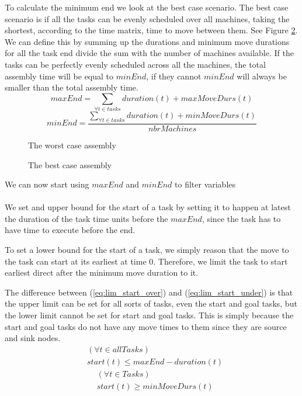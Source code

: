    To calculate the minimum end we look at the best case scenario. The best case scenario is if all the tasks can be evenly scheduled over all machines, taking the shortest, according to the time matrix, time to move between them. See Figure \ref{fig:best_case}. We can define this by summing up the durations and minimum move durations for all the task end divide the sum with the number of machines available. If the tasks can be perfectly evenly scheduled across all the machines, the total assembly time will be equal to $minEnd$, if they cannot $minEnd$ will always be smaller than the total assembly time.
  \begin{equation}\label{eq:59}
 	maxEnd = \sum_{\forall t \in tasks} duration(t) + maxMoveDurs(t)
  \end{equation}
  \begin{equation}\label{eq:minEnd}
  	minEnd = \frac{\sum_{\forall t \in tasks} duration(t) + minMoveDurs(t)}{nbrMachines}
  \end{equation}

 
  \begin{figure}
  	\centering
  	
  	\caption{The worst case assembly}
  	\label{fig:worst_case}
  \end{figure}
   \begin{figure}
   	\centering
   	
   	\caption{The best case assembly}
   	\label{fig:best_case}
   \end{figure}
 
 \noindent We can now start using $maxEnd$ and $minEnd$ to filter variables
 \\\\
  We set and upper bound for the start of a task by setting it to happen at latest the duration of the task time units before the $maxEnd$, since the task has to have time to execute before the end.
  
  To set a lower bound for the start of a task, we simply reason that the move to the task can start at its earliest at time 0. Therefore, we limit the task to start earliest direct after the minimum move duration to it.
  
  The difference between (\ref{eq:lim_start_over}) and (\ref{eq:lim_start_under}) is that the upper limit can be set for all sorts of tasks, even the start and goal tasks, but the lower limit cannot be set for start and goal tasks. This is simply because the start and goal tasks do not have any move times to them since they are source and sink nodes.
  \begin{equation}\label{eq:lim_start_over}
  \begin{aligned}
 &(\forall t \in allTasks)\\
 &start(t) \le maxEnd-duration(t)
  \end{aligned}
  \end{equation}
   \begin{equation}\label{eq:lim_start_under}
  \begin{aligned}
 &(\forall t \in Tasks)\\
 &start(t) \ge minMoveDurs(t)
  \end{aligned}
  \end{equation}

